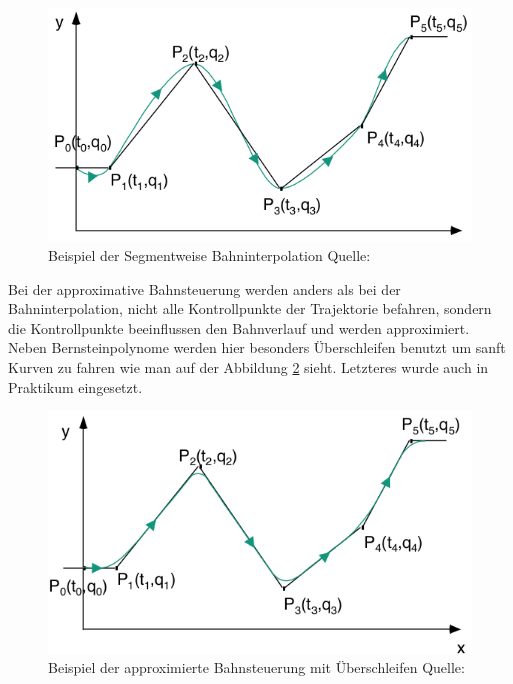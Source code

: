  \begin{figure}[h]
\center
\includegraphics[scale=0.35]{graphics/segmentinterpolation.png}
\caption{\label{fig:segmentinterpolation} Beispiel der Segmentweise Bahninterpolation Quelle: \citep{rob1}}
\end{figure}
 
 
 Bei der approximative Bahnsteuerung werden anders als bei der Bahninterpolation, nicht alle Kontrollpunkte der Trajektorie befahren, sondern die Kontrollpunkte beeinflussen den Bahnverlauf und werden approximiert. Neben Bernsteinpolynome werden hier besonders Überschleifen benutzt um sanft Kurven zu fahren wie man auf der Abbildung \ref{fig:ueberschleifeninterpolation} sieht. Letzteres wurde auch in Praktikum eingesetzt.
 \begin{figure}[h]
\center
\includegraphics[scale=0.35]{graphics/ueberschleifeninterpolation.png}
\caption{\label{fig:ueberschleifeninterpolation} Beispiel der approximierte Bahnsteuerung mit Überschleifen Quelle: \citep{rob1}}
\end{figure}




